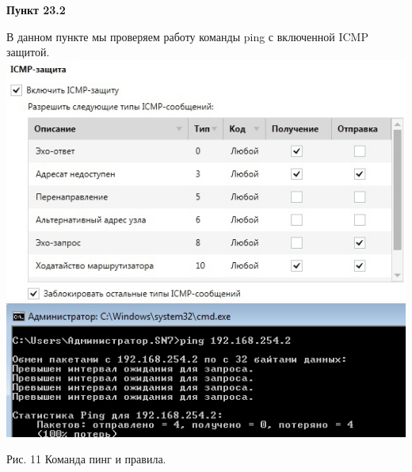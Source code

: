 \documentclass[a4paper,14pt]{extarticle}
\begin{document}
    \textbf{Пункт 23.2}
    \begin{center}
        В данном пункте мы проверяем работу команды ping с включенной ICMP защитой.
        \includegraphics[scale=0.45]{pics/23.2_1.jpg}
        \includegraphics[scale=0.45]{pics/23.2_2.jpg}

        Рис. 11 Команда пинг и правила.
    \end{center}
\end{document}
